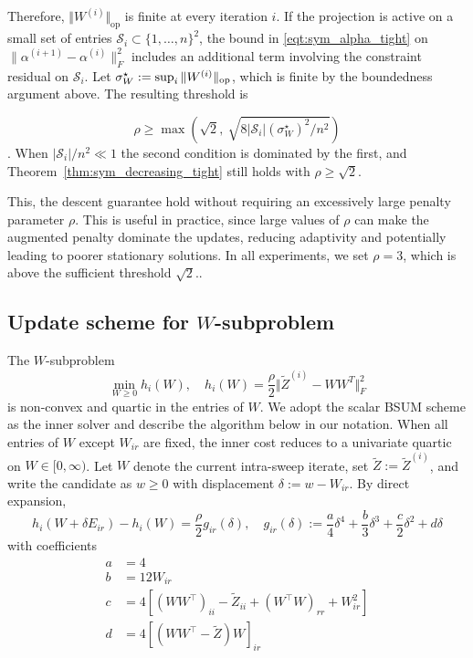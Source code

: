 \documentclass{article}
\begin{document}
Therefore, $\Vert W^{(i)} \Vert_{\text{op}}$ is finite at every iteration $i$. If the projection is active on a small set of entries $\mathcal{S}_i \subset \{1,\dots,n\}^2$, the bound in \eqref{eqt:sym_alpha_tight} on $\|\alpha^{(i+1)} - \alpha^{(i)}\|_F^2$ includes an additional term involving the constraint residual on $\mathcal{S}_i$. Let $\sigma_W^\star := \sup_i \|W^{(i)}\|_{\rm op}$, which is finite by the boundedness argument above. The resulting threshold is 

\[\rho \geq \max(\sqrt{2},\ \sqrt{8|\mathcal{S}_i|(\sigma_W^\star)^2/n^2})
\]. 
When $|\mathcal{S}_i|/n^2 \ll 1$ the second condition is dominated by the first, and Theorem~\ref{thm:sym_decreasing_tight} still holds with $\rho \geq \sqrt 2$.


This, the descent guarantee hold without requiring an excessively large penalty parameter $\rho$. This is useful in practice, since large values of $\rho$ can make the augmented penalty dominate the updates, reducing adaptivity and potentially leading to poorer stationary solutions. In all experiments, we set $\rho = 3$, which is above the sufficient threshold $\sqrt{2}$..


\subsection{Update scheme for \texorpdfstring{$W$}{W}-subproblem}\label{sec:bsum}

The $W$-subproblem 
\[
\min_{W \geq 0} h_i(W), \quad h_i(W) = \frac{\rho}{2} \Vert \widetilde{Z}^{(i)} - WW^T \Vert^2_F
\]
is non-convex and quartic in the entries of $W$. We adopt the scalar BSUM scheme as the inner solver and describe the algorithm below in our notation.
When all entries of $W$ except $W_{ir}$ are fixed, the inner cost reduces to a univariate quartic on $W \in [0, \infty)$. Let $W$ denote the current intra-sweep iterate, set $\widetilde{Z} := \widetilde{Z}^{(i)}$, and write the candidate as $w \geq 0$ with displacement $\delta := w - W_{ir}$. By direct expansion, 
\begin{equation}
h_i(W + \delta E_{ir}) - h_i(W) = \frac{\rho}{2}g_{ir}(\delta), \quad g_{ir}(\delta) := \frac{a}{4} \delta^4 + \frac{b}{3} \delta^3 + \frac{c}{2} \delta^2 + d \delta
\end{equation}
with coefficients
\begin{align}
a &= 4 \\
b &= 12 W_{ir} \\
c &= 4 \left[ (WW^{\top})_{ii} - \widetilde{Z}_{ii} + (W^{\top} W)_{rr} + W^2_{ir} \right] \\
d &= 4 \left[ (WW^{\top} - \widetilde{Z}) W\right]_{ir}
\end{align}
\end{document}
